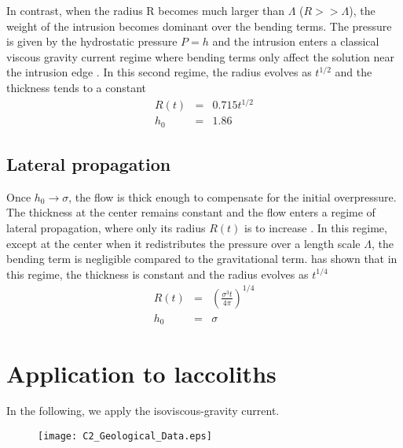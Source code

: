 In  contrast, when  the radius  R becomes  much larger  than $\Lambda$
($R>>\Lambda$), the weight of the  intrusion becomes dominant over the
bending  terms.  The  pressure is  given by  the hydrostatic  pressure
$P = h$  and the intrusion enters a classical  viscous gravity current
regime where bending terms only affect the solution near the intrusion
edge   \citep{Huppert:1982a,Michaut:2011kg,Lister:2013ia}.   In   this
second regime, the radius evolves as $t^{1/2}$ and the thickness tends
to a constant
\begin{eqnarray}
  R(t) &=& 0.715 t^{1/2}\label{Scaling-R-Gravi}\\
  h_0 &=& 1.86\label{Scaling-H-Gravi}
\end{eqnarray} 

\subsection{Lateral propagation}
\label{sec:lateral-propagation}

Once $h_0\rightarrow \sigma$,  the flow is thick  enough to compensate
for  the initial  overpressure. The  thickness at  the center  remains
constant and  the flow enters  a regime of lateral  propagation, where
only its radius $R(t)$ is  to increase \citep{Michaut:2011kg}. In this
regime, except at the center when it redistributes the pressure over a
length scale $\Lambda$, the bending term is negligible compared to the
gravitational  term. \citet{Michaut:2011kg}  has  shown  that in  this
regime, the thickness is constant and the radius evolves as $t^{1/4}$
\begin{eqnarray}
  R(t) &=& \left(\frac{\sigma^3 t}{4\pi}\right)^{1/4}\label{Scaling-R-Propa}\\
  h_0 &=& \sigma\label{Scaling-H-Propa}
\end{eqnarray} 

\section{Application to laccoliths}
\label{C2-sec:appl-earth-moon}

In the following, we apply the isoviscous-gravity current.
\begin{figure}
  \begin{center}
    \graphicspath{ {/Users/thorey/Documents/These/Manuscript/Figure/Chapter2/} }
    \texttt{[image: C2\_Geological\_Data.eps]}
    \caption{}
    \label{C2_Geological_Data}
  \end{center}
\end{figure}


